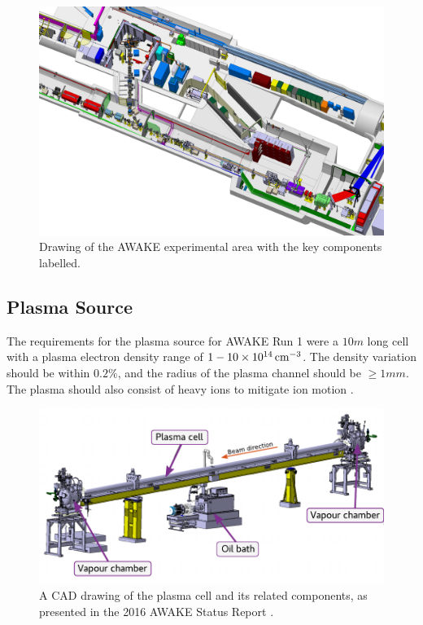 \begin{figure}[hbt]
    \centering
    \includegraphics[width=0.99\linewidth,trim={0mm 0mm 0mm 0mm},clip]{figures/AwakeExperiment}
    \caption{\label{Fig:WFA:AWAKE} Drawing of the AWAKE experimental area with the key components labelled.}
\end{figure}

\subsection{Plasma Source}
\label{WFA:Design:Plasma}

The requirements for the plasma source for AWAKE Run 1 were a $10\unit{m}$ long cell with a plasma electron density range of $1-10\times 10^{14}\,\mathrm{cm}^{-3}$. The density variation should be within $0.2\%$, and the radius of the plasma channel should be $\geq 1\unit{mm}$. The plasma should also consist of heavy ions to mitigate ion motion \cite{caldwell:2015}.

\begin{figure}[hbt]
    \centering
    \includegraphics[width=0.99\linewidth,trim={0mm 0mm 0mm 0mm},clip]{figures/PlasmaCell}
    \caption{\label{Fig:WFA:PlasmaCell} A CAD drawing of the plasma cell and its related components, as presented in the 2016 AWAKE Status Report \cite{awake_collaboration:2016}.}
\end{figure}

